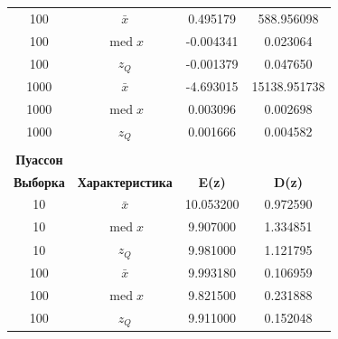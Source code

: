 \documentclass[a4paper]{article}
\begin{document}
\begin{table}[!htbp]
{\begin{tabular}{|c|c|c|c|}
                100              & $\bar{x}$               & 0.495179      & 588.956098    \\
                100              & $\operatorname{med} x$  & -0.004341     & 0.023064      \\
                100              & $z_Q$                   & -0.001379     & 0.047650      \\            \hline

                1000             & $\bar{x}$               & -4.693015     & 15138.951738  \\
                1000             & $\operatorname{med} x$  & 0.003096      & 0.002698      \\
                1000             & $z_Q$                   & 0.001666      & 0.004582      \\
                \hline \\
                \multicolumn{1}{|c|}{\textbf{Пуассон}} \\
                \hline
                \textbf{Выборка} & \textbf{Характеристика} & \textbf{E(z)} & \textbf{D(z)} \\
                \hline
                10               & $\bar{x}$               & 10.053200     & 0.972590      \\
                10               & $\operatorname{med} x$  & 9.907000      & 1.334851      \\
                10               & $z_Q$                   & 9.981000      & 1.121795      \\            \hline

                100              & $\bar{x}$               & 9.993180      & 0.106959      \\
                100              & $\operatorname{med} x$  & 9.821500      & 0.231888      \\
                100              & $z_Q$                   & 9.911000      & 0.152048      \\            \hline


\end{tabular}}
\end{table}
\end{document}
